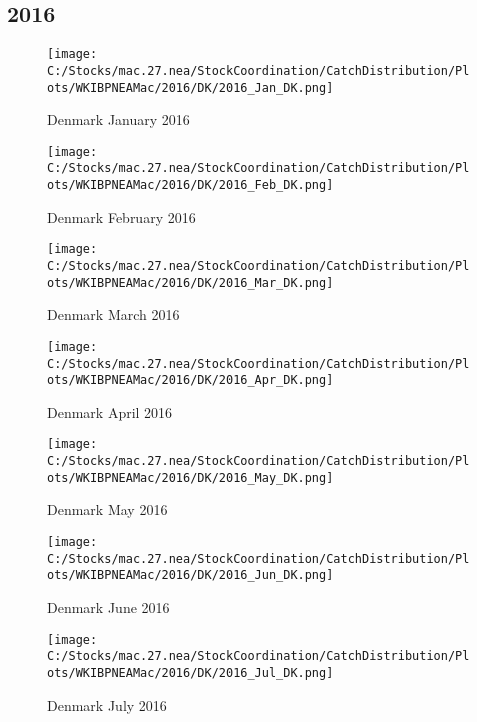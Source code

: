 \documentclass{article}
\begin{document}
\subsection{2016}



\begin{figure}[h]
	\centering
		\texttt{[image: C:/Stocks/mac.27.nea/StockCoordination/CatchDistribution/Plots/WKIBPNEAMac/2016/DK/2016\_Jan\_DK.png]}
	\caption{Denmark January 2016}
	\label{fig:2016_Jan_DK}
\end{figure}

\begin{figure}
	\centering
		\texttt{[image: C:/Stocks/mac.27.nea/StockCoordination/CatchDistribution/Plots/WKIBPNEAMac/2016/DK/2016\_Feb\_DK.png]}
	\caption{Denmark February 2016}
	\label{fig:2016_Feb_DK}
\end{figure}

\begin{figure}
	\centering
		\texttt{[image: C:/Stocks/mac.27.nea/StockCoordination/CatchDistribution/Plots/WKIBPNEAMac/2016/DK/2016\_Mar\_DK.png]}
	\caption{Denmark March 2016}
	\label{fig:2016_Mar_DK}
\end{figure}

\begin{figure}
	\centering
		\texttt{[image: C:/Stocks/mac.27.nea/StockCoordination/CatchDistribution/Plots/WKIBPNEAMac/2016/DK/2016\_Apr\_DK.png]}
	\caption{Denmark April 2016}
	\label{fig:2016_Apr_DK}
\end{figure}

\begin{figure}
	\centering
		\texttt{[image: C:/Stocks/mac.27.nea/StockCoordination/CatchDistribution/Plots/WKIBPNEAMac/2016/DK/2016\_May\_DK.png]}
	\caption{Denmark May 2016}
	\label{fig:2016_May_DK}
\end{figure}

\begin{figure}
	\centering
		\texttt{[image: C:/Stocks/mac.27.nea/StockCoordination/CatchDistribution/Plots/WKIBPNEAMac/2016/DK/2016\_Jun\_DK.png]}
	\caption{Denmark June 2016}
	\label{fig:2016_Jun_DK}
\end{figure}

\begin{figure}
	\centering
		\texttt{[image: C:/Stocks/mac.27.nea/StockCoordination/CatchDistribution/Plots/WKIBPNEAMac/2016/DK/2016\_Jul\_DK.png]}
	\caption{Denmark July 2016}
	\label{fig:2016_Jul_DK}
\end{figure}
\end{document}
